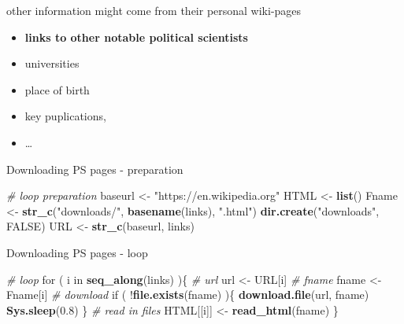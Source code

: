 \documentclass[ignorenonframetext,]{beamer}
\newenvironment{Shaded}{\begin{snugshade}}{\end{snugshade}}
\newcommand{\KeywordTok}[1]{\textcolor[rgb]{0.13,0.29,0.53}{\textbf{{#1}}}}
\newcommand{\FloatTok}[1]{\textcolor[rgb]{0.00,0.00,0.81}{{#1}}}
\newcommand{\StringTok}[1]{\textcolor[rgb]{0.31,0.60,0.02}{{#1}}}
\newcommand{\CommentTok}[1]{\textcolor[rgb]{0.56,0.35,0.01}{\textit{{#1}}}}
\newcommand{\OtherTok}[1]{\textcolor[rgb]{0.56,0.35,0.01}{{#1}}}
\newcommand{\NormalTok}[1]{{#1}}
\providecommand{\tightlist}{%
  \setlength{\itemsep}{0pt}\setlength{\parskip}{0pt}}
\begin{document}
\begin{frame}{other information might come from their personal
wiki-pages}

\begin{itemize}
\tightlist
\item
  \textbf{links to other notable political scientists}
\item
  universities
\item
  place of birth
\item
  key puplications,
\item
  \ldots{}
\end{itemize}

\end{frame}

\begin{frame}[fragile]{Downloading PS pages - preparation}

\begin{Shaded}
\begin{Highlighting}[]
\CommentTok{# loop preparation}
\NormalTok{baseurl <-}\StringTok{ "https://en.wikipedia.org"}
\NormalTok{HTML    <-}\StringTok{ }\KeywordTok{list}\NormalTok{()}
\NormalTok{Fname   <-}\StringTok{ }\KeywordTok{str_c}\NormalTok{(}\StringTok{"downloads/"}\NormalTok{, }\KeywordTok{basename}\NormalTok{(links), }\StringTok{".html"}\NormalTok{)}
\KeywordTok{dir.create}\NormalTok{(}\StringTok{"downloads"}\NormalTok{, }\OtherTok{FALSE}\NormalTok{)}
\NormalTok{URL     <-}\StringTok{ }\KeywordTok{str_c}\NormalTok{(baseurl, links)}
\end{Highlighting}
\end{Shaded}

\end{frame}

\begin{frame}[fragile]{Downloading PS pages - loop}

\begin{Shaded}
\begin{Highlighting}[]
\CommentTok{# loop}
\NormalTok{for ( i in }\KeywordTok{seq_along}\NormalTok{(links) )\{}
  \CommentTok{# url}
  \NormalTok{url <-}\StringTok{ }\NormalTok{URL[i]}
  \CommentTok{# fname}
  \NormalTok{fname <-}\StringTok{ }\NormalTok{Fname[i]}
  \CommentTok{# download}
  \NormalTok{if ( !}\KeywordTok{file.exists}\NormalTok{(fname) )\{}
    \KeywordTok{download.file}\NormalTok{(url, fname)}
    \KeywordTok{Sys.sleep}\NormalTok{(}\FloatTok{0.8}\NormalTok{)}
  \NormalTok{\} }
  \CommentTok{# read in files}
  \NormalTok{HTML[[i]] <-}\StringTok{ }\KeywordTok{read_html}\NormalTok{(fname)}
\NormalTok{\}}
\end{Highlighting}
\end{Shaded}

\end{frame}
\end{document}
